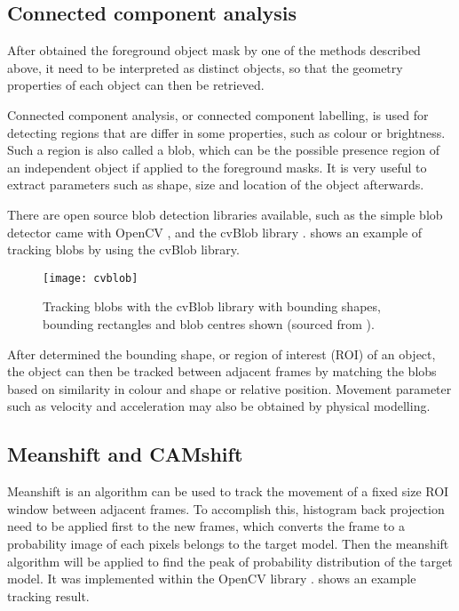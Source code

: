 \subsection{Connected component analysis}
\label{blob}

After obtained the foreground object mask by one of the methods described above, it need to be interpreted as distinct objects, so that the geometry properties of each object can then be retrieved.

Connected component analysis, or connected component labelling, is used for detecting regions that are differ in some properties, such as colour or brightness. Such a region is also called a blob, which can be the possible presence region of an independent object if applied to the foreground masks. It is very useful to extract parameters such as shape, size and location of the object afterwards.

There are open source blob detection libraries available, such as the simple blob detector came with OpenCV \cite{opencv:blob}, and the cvBlob library \cite{cvblob}.  shows an example of tracking blobs by using the cvBlob library.


\begin{figure}[H]
  \centering
  \texttt{[image: cvblob]}
  \caption{Tracking blobs with the cvBlob library with bounding shapes, bounding rectangles and blob centres shown (sourced from \cite{cvblob}).}
  \label{cvblob}
\end{figure}

After determined the bounding shape, or region of interest (ROI) of an object, the object can then be tracked between adjacent frames by matching the blobs based on similarity in colour and shape or relative position. Movement parameter such as velocity and acceleration may also be obtained by physical modelling.

\subsection{Meanshift and CAMshift}

Meanshift \cite{fukunaga2013introduction} is an algorithm can be used to track the movement of a fixed size ROI window between adjacent frames. To accomplish this, histogram back projection need to be applied first to the new frames, which converts the frame to a probability image of each pixels belongs to the target model. Then the meanshift algorithm will be applied to find the peak of probability distribution of the target model. It was implemented within the OpenCV library \cite{opencv:camshift}.  shows an example tracking result.


